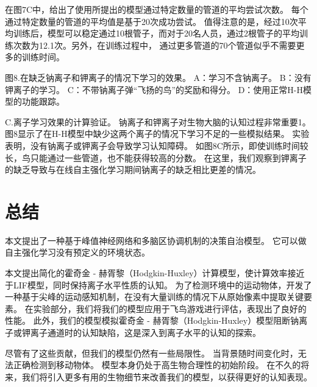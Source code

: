 \documentclass[a4paper,12pt]{ctexart}
\begin{document}
在图7C中，给出了使用所提出的模型通过特定数量的管道的平均尝试次数。 每个通过特定数量的管道的平均值是基于20次成功尝试。 值得注意的是，经过10次平均训练后，模型可以稳定通过10根管子，而对于20名人员，通过2根管子的平均训练次数为12.1次。另外，在训练过程中， 通过更多管道的70个管道似乎不需要更多的训练时间。

图8.在缺乏钠离子和钾离子的情况下学习的效果。 A：学习不含钠离子。 B：没有钾离子的学习。 C：不带钠离子弹“飞扬的鸟”的奖励和得分。 D：使用正常H-H模型的功能跟踪。


C.离子学习效果的计算验证。 钠离子和钾离子对生物大脑的认知过程非常重要1。 图8显示了在H-H模型中缺少这两个离子的情况下学习不足的一些模拟结果。 实验表明，没有钠离子或钾离子会导致学习认知障碍。 如图8C所示，即使训练时间较长，鸟只能通过一些管道，也不能获得较高的分数。 在这里，我们观察到钾离子的缺乏导致与在线自主强化学习期间钠离子的缺乏相比更差的情况。


\section{总结}

本文提出了一种基于峰值神经网络和多脑区协调机制的决策自治模型。 它可以做自主强化学习没有预定义的环境状态。

本文提出简化的霍奇金 - 赫胥黎（Hodgkin-Huxley）计算模型，使计算效率接近于LIF模型，同时保持离子水平性质的认知。 为了检测环境中的运动物体，开发了一种基于尖峰的运动感知机制，在没有大量训练的情况下从原始像素中提取关键要素。 在实验部分，我们将我们的模型应用于飞鸟游戏进行评估，表现出了良好的性能。 此外，我们的模型模拟霍奇金 - 赫胥黎（Hodgkin-Huxley）模型阻断钠离子或钾离子通道时的认知缺陷，这是深入到离子水平的认知的探索。

尽管有了这些贡献，但我们的模型仍然有一些局限性。 当背景随时间变化时，无法正确检测到移动物体。 模型本身仍处于高生物合理性的初始阶段。 在不久的将来，我们将引入更多有用的生物细节来改善我们的模型，以获得更好的认知表现。
\end{document}
